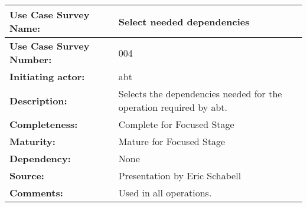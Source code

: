 \begin{tabularx}{\linewidth}{|l|X|}
\hline
\textbf{Use Case Survey Name:} & \textbf{Select needed dependencies} \\
\hline
\textbf{Use Case Survey Number:} & 004 \\
\hline
\textbf{Initiating actor:} & abt \\
\hline
\textbf{Description:} & Selects the dependencies needed for the operation required by abt.\\
\hline
\textbf{Completeness:} & Complete for Focused Stage \\
\hline
\textbf{Maturity:} & Mature for Focused Stage \\
\hline
\textbf{Dependency:} & None \\
\hline
\textbf{Source:} & Presentation by Eric Schabell \\
\hline
\textbf{Comments:} & Used in all operations. \\
\hline
\end{tabularx}
